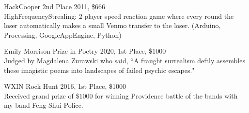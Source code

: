 HackCooper 2nd Place 2011, \$666  \\
HighFrequencyStrealing: 2 player speed reaction game where every round the loser automatically makes a small Venmo transfer to the loser. (Arduino, Processing, GoogleAppEngine, Python)

Emily Morrison Prize in Poetry 2020, 1st Place,  \$1000  \\
Judged by Magdalena Zurawski who said, ``A fraught surrealism deftly assembles these imagistic poems into landscapes of failed psychic escapes."

WXIN Rock Hunt 2016, 1st Place, \$1000  \\
Received grand prize of \$1000 for winning Providence battle of the bands with my band Feng Shui Police.









 

